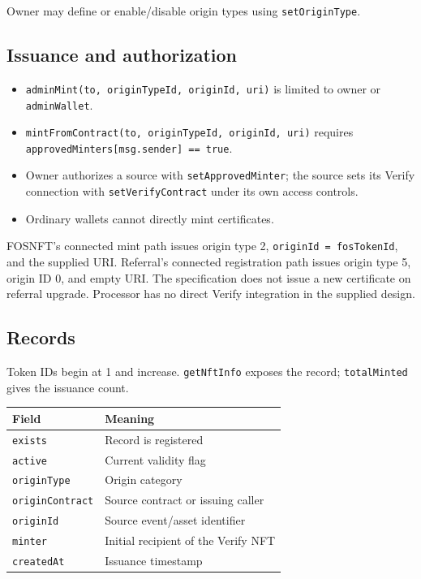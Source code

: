 \documentclass[
  10pt,
  letterpaper,
]{article}
\providecommand{\tightlist}{%
  \setlength{\itemsep}{0pt}\setlength{\parskip}{0pt}}
\begin{document}
Owner may define or enable/disable origin types using
\texttt{setOriginType}.

\subsection{Issuance and
authorization}\label{issuance-and-authorization}

\begin{itemize}
\tightlist
\item
  \texttt{adminMint(to,\ originTypeId,\ originId,\ uri)} is limited to
  owner or \texttt{adminWallet}.
\item
  \texttt{mintFromContract(to,\ originTypeId,\ originId,\ uri)} requires
  \texttt{approvedMinters{[}msg.sender{]}\ ==\ true}.
\item
  Owner authorizes a source with \texttt{setApprovedMinter}; the source
  sets its Verify connection with \texttt{setVerifyContract} under its
  own access controls.
\item
  Ordinary wallets cannot directly mint certificates.
\end{itemize}

FOSNFT's connected mint path issues origin type 2,
\texttt{originId\ =\ fosTokenId}, and the supplied URI. Referral's
connected registration path issues origin type 5, origin ID 0, and empty
URI. The specification does not issue a new certificate on referral
upgrade. Processor has no direct Verify integration in the supplied
design.

\subsection{Records}\label{records}

Token IDs begin at 1 and increase. \texttt{getNftInfo} exposes the
record; \texttt{totalMinted} gives the issuance count.

\begin{longtable}[]{@{}ll@{}}
\toprule\noalign{}
Field & Meaning \\
\midrule\noalign{}
\endhead
\bottomrule\noalign{}
\endlastfoot
\texttt{exists} & Record is registered \\
\texttt{active} & Current validity flag \\
\texttt{originType} & Origin category \\
\texttt{originContract} & Source contract or issuing caller \\
\texttt{originId} & Source event/asset identifier \\
\texttt{minter} & Initial recipient of the Verify NFT \\
\texttt{createdAt} & Issuance timestamp \\
\end{longtable}
\end{document}
